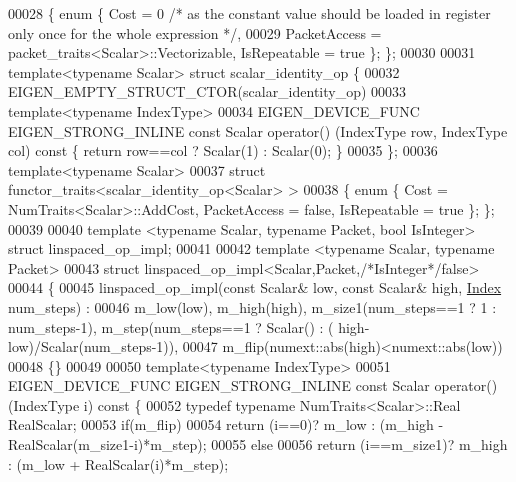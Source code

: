 \begin{DoxyCode}
00028 \{ \textcolor{keyword}{enum} \{ Cost = 0 \textcolor{comment}{/* as the constant value should be loaded in register only once for the whole expression 
      */},
00029          PacketAccess = packet\_traits<Scalar>::Vectorizable, IsRepeatable = \textcolor{keyword}{true} \}; \};
00030 
00031 \textcolor{keyword}{template}<\textcolor{keyword}{typename} Scalar> \textcolor{keyword}{struct }scalar\_identity\_op \{
00032   EIGEN\_EMPTY\_STRUCT\_CTOR(scalar\_identity\_op)
00033   \textcolor{keyword}{template}<\textcolor{keyword}{typename} IndexType>
00034   EIGEN\_DEVICE\_FUNC EIGEN\_STRONG\_INLINE \textcolor{keyword}{const} Scalar operator() (IndexType row, IndexType col)\textcolor{keyword}{ const }\{ \textcolor{keywordflow}{
      return} row==col ? Scalar(1) : Scalar(0); \}
00035 \};
00036 \textcolor{keyword}{template}<\textcolor{keyword}{typename} Scalar>
00037 \textcolor{keyword}{struct }functor\_traits<scalar\_identity\_op<Scalar> >
00038 \{ \textcolor{keyword}{enum} \{ Cost = NumTraits<Scalar>::AddCost, PacketAccess = \textcolor{keyword}{false}, IsRepeatable = \textcolor{keyword}{true} \}; \};
00039 
00040 \textcolor{keyword}{template} <\textcolor{keyword}{typename} Scalar, \textcolor{keyword}{typename} Packet, \textcolor{keywordtype}{bool} IsInteger> \textcolor{keyword}{struct }linspaced\_op\_impl;
00041 
00042 \textcolor{keyword}{template} <\textcolor{keyword}{typename} Scalar, \textcolor{keyword}{typename} Packet>
00043 \textcolor{keyword}{struct }linspaced\_op\_impl<Scalar,Packet,\textcolor{comment}{/*IsInteger*/}false>
00044 \{
00045   linspaced\_op\_impl(\textcolor{keyword}{const} Scalar& low, \textcolor{keyword}{const} Scalar& high, \hyperlink{namespace_eigen_a62e77e0933482dafde8fe197d9a2cfde}{Index} num\_steps) :
00046     m\_low(low), m\_high(high), m\_size1(num\_steps==1 ? 1 : num\_steps-1), m\_step(num\_steps==1 ? Scalar() : (
      high-low)/Scalar(num\_steps-1)),
00047     m\_flip(numext::abs(high)<numext::abs(low))
00048   \{\}
00049 
00050   \textcolor{keyword}{template}<\textcolor{keyword}{typename} IndexType>
00051   EIGEN\_DEVICE\_FUNC EIGEN\_STRONG\_INLINE \textcolor{keyword}{const} Scalar operator() (IndexType i)\textcolor{keyword}{ const }\{
00052     \textcolor{keyword}{typedef} \textcolor{keyword}{typename} NumTraits<Scalar>::Real RealScalar;
00053     \textcolor{keywordflow}{if}(m\_flip)
00054       \textcolor{keywordflow}{return} (i==0)? m\_low : (m\_high - RealScalar(m\_size1-i)*m\_step);
00055     \textcolor{keywordflow}{else}
00056       \textcolor{keywordflow}{return} (i==m\_size1)? m\_high : (m\_low + RealScalar(i)*m\_step);

\end{DoxyCode}
